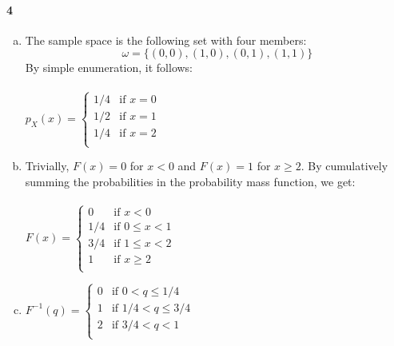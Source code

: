 \documentclass[10pt,letterpaper]{article}
\begin{document}
\paragraph{4}
\begin{enumerate}[(a)]
    \item The sample space is the following set with four members: 
        \[
            \omega = \{(0,0), (1,0), (0,1), (1,1)\}
        \]
        By simple enumeration, it follows:\\ 
        \text{} \\
    $p_X(x) = \begin{cases}
        1/4 & \text{if } x = 0\\
        1/2 & \text{if } x = 1\\
        1/4 & \text{if } x = 2\\
    \end{cases}$
    \item Trivially, $F(x)=0$ for $x<0$ and $F(x)=1$ for $x \ge 2$. By cumulatively summing the probabilities in the probability mass function, we get: \\
    \text{} \\
    $F(x) = \begin{cases}
        0 & \text{if } x<0\\
        1/4 & \text{if } 0 \le x < 1\\
        3/4 & \text{if } 1 \le x < 2\\
        1 & \text{if } x \ge 2\\
    \end{cases}$
    \item $F^{-1}(q) = \begin{cases}
         0 & \text{if } 0 < q \le 1/4\\
         1 & \text{if } 1/4 < q \le 3/4\\
         2 & \text{if } 3/4 < q < 1\\
    \end{cases}$
\end{enumerate}
\end{document}

